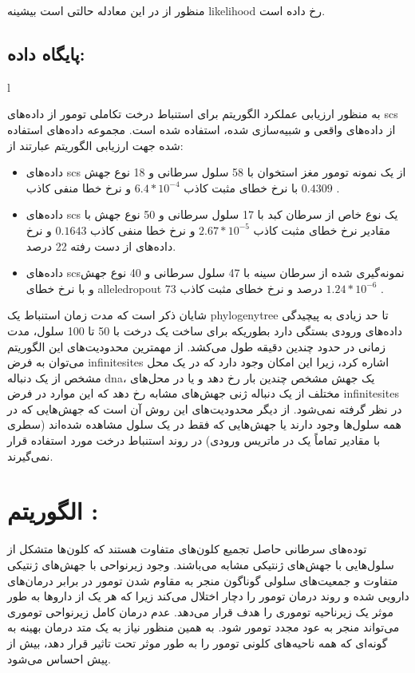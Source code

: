 منظور از  در این معادله حالتی است بیشینه \gls{likelihood} رخ داده است.  

\subsection{پایگاه داده:}l

به منظور ارزیابی عملکرد الگوریتم  برای استنباط درخت تکاملی تومور از داده‌های \gls{scs} از داده‌های واقعی و شبیه‌سازی شده، استفاده شده است. مجموعه داده‌های استفاده شده جهت ارزیابی الگوریتم عبارتند از: 

\begin{itemize}
	\item      داده‌های  \gls{scs} از یک نمونه تومور مغز استخوان با 58 سلول سرطانی و 18 نوع جهش با نرخ خطای مثبت کاذب $6.4*10^{-4}$ و نرخ خطا    منفی کاذب $ 0.4309$ . 
	\item     داده‌های  \gls{scs} یک نوع خاص از سرطان کبد با 17 سلول سرطانی و 50 نوع جهش با مقادیر نرخ خطای مثبت کاذب  $2.67 * 10^{-5}$ و نرخ خطا منفی کاذب $0.1643$ و نرخ داده‌های از دست رفته 22 درصد. 
	\item     داده‌های \gls{scs}نمونه‌گیری شده از سرطان سینه با 47 سلول سرطانی و 40 نوع جهش و با نرخ خطای \gls{alleledropout} 73 درصد و نرخ خطای مثبت کاذب $1.24 * 10^{-6}$ . 
\end{itemize}


شایان ذکر است که مدت زمان استنباط یک \gls{phylogenytree} تا حد زیادی به پیچیدگی داده‌های ورودی بستگی دارد بطوریکه برای ساخت یک درخت با 50 تا 100 سلول، مدت زمانی در حدود چندین دقیقه طول می‌کشد. از مهمترین محدودیت‌های این الگوریتم می‌توان به فرض \gls{infinitesites} اشاره کرد، زیرا این امکان وجود دارد که در یک محل مشخص از یک دنباله \gls{dna}، یک جهش مشخص چندین بار رخ دهد و یا در محل‌های مختلف از یک دنباله ژنی جهش‌های مشابه رخ دهد که این موارد در فرض \gls{infinitesites} در نظر گرفته نمی‌شود. از دیگر محدودیت‌های این روش آن است که جهش‌هایی که در همه سلول‌ها وجود دارند یا جهش‌هایی که فقط در یک سلول مشاهده شده‌اند (سطری با مقادیر تماماً یک در ماتریس ورودی) در روند استنباط درخت مورد استفاده قرار نمی‌گیرند. 


\section{الگوریتم :\cite{ross2016onconem}}

توده‌های سرطانی حاصل تجمیع کلون‌های متفاوت هستند که کلون‌ها متشکل از سلول‌هایی با جهش‌های ژنتیکی مشابه می‌باشند. وجود زیرنواحی با جهش‌های ژنتیکی متفاوت و جمعیت‌های سلولی گوناگون منجر به مقاوم شدن تومور در برابر درمان‌های دارویی شده و روند درمان تومور را دچار اختلال می‌کند زیرا که هر یک از داروها به طور موثر یک زیرناحیه توموری را هدف قرار می‌دهد. عدم درمان کامل زیرنواحی توموری می‌تواند منجر به عود مجدد تومور شود. به همین منظور نیاز به یک متد درمان بهینه به گونه‌ای که همه ناحیه‌های کلونی تومور را به طور موثر تحت تاثیر قرار دهد، بیش از پیش احساس می‌شود.  \cite{ross2016onconem}

